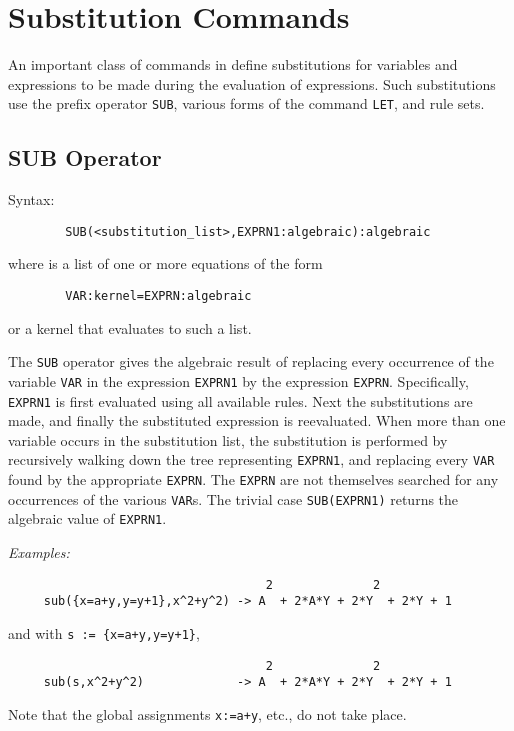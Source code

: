 \chapter{Substitution Commands}
An important class of commands in {\REDUCE} define
substitutions for variables and expressions to be made during the
evaluation of expressions.  Such substitutions use the prefix operator
\texttt{SUB}, various forms of the command \texttt{LET}, and rule sets.

\section{SUB Operator}
\hypertarget{operator:SUB}{}

Syntax:
\begin{verbatim}
        SUB(<substitution_list>,EXPRN1:algebraic):algebraic
\end{verbatim}
where  is a list of one or more equations of the
form
\begin{verbatim}
        VAR:kernel=EXPRN:algebraic
\end{verbatim}
or a kernel that evaluates to such a list.

The \texttt{SUB} operator gives the algebraic result of replacing every
occurrence of the variable \texttt{VAR} in the expression \texttt{EXPRN1} by the
expression \texttt{EXPRN}.  Specifically, \texttt{EXPRN1} is first evaluated
using all available rules.  Next the substitutions are made, and finally
the substituted expression is reevaluated.  When more than one variable
occurs in the substitution list, the substitution is performed by
recursively walking down the tree representing \texttt{EXPRN1}, and replacing
every \texttt{VAR} found by the appropriate \texttt{EXPRN}.  The \texttt{EXPRN} are
not themselves searched for any occurrences of the various \texttt{VAR}s.
The trivial case \texttt{SUB(EXPRN1)} returns the algebraic value of
\texttt{EXPRN1}.

\textit{Examples:}
\begin{verbatim}
                                    2              2
     sub({x=a+y,y=y+1},x^2+y^2) -> A  + 2*A*Y + 2*Y  + 2*Y + 1
\end{verbatim}
and with \texttt{s := \{x=a+y,y=y+1\}},
\begin{verbatim}
                                    2              2
     sub(s,x^2+y^2)             -> A  + 2*A*Y + 2*Y  + 2*Y + 1
\end{verbatim}
Note that the global assignments \texttt{x:=a+y}, etc., do not take place.

